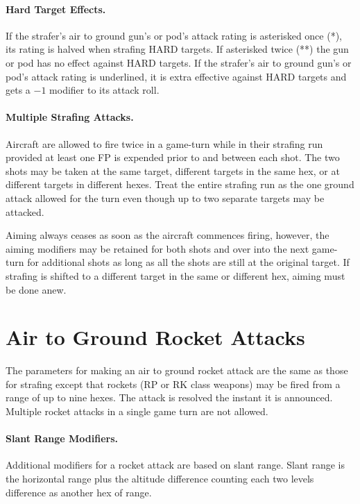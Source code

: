 \paragraph{Hard Target Effects.} If the strafer's air to ground gun's or pod's attack rating is asterisked once (*), its rating is halved when strafing HARD targets. If asterisked twice (**) the gun or pod has no effect against HARD targets. If the strafer's air to ground gun's or pod's attack rating is underlined, it is extra effective against HARD targets and gets a $-1$ modifier to its attack roll.

\paragraph{Multiple Strafing Attacks.} Aircraft are allowed to fire twice in a game-turn while in their strafing run provided at least one FP is expended prior to and between each shot. The two shots may be taken at the same target, different targets in the same hex, or at different targets in different hexes. Treat the entire strafing run as the one ground attack allowed for the turn even though up to two separate targets may be attacked.

Aiming always ceases as soon as the aircraft commences firing, however, the aiming modifiers may be retained for both shots and over into the next game-turn for additional shots as long as all the shots are still at the original target. If strafing is shifted to a different target in the same or different hex, aiming must be done anew.

\section{Air to Ground Rocket Attacks}

The parameters for making an air to ground rocket attack are the same as those for strafing except that rockets (RP or RK class weapons) may be fired from a range of up to nine hexes. The attack is resolved the instant it is announced. Multiple rocket attacks in a single game turn are not allowed.

\paragraph{Slant Range Modifiers.} Additional modifiers for a rocket attack are based on slant range. Slant range is the horizontal range plus the altitude difference counting each two levels difference as another hex of range.

